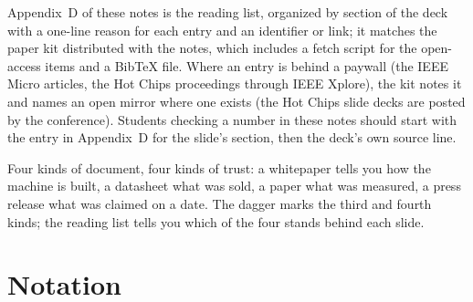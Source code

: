 \documentclass[11pt,letterpaper]{article}
\newcommand{\setstage}[1]{\colorlet{stagec}{#1}}
\newenvironment{intuition}{\begin{tcolorbox}[intuitionbox]}{\end{tcolorbox}}
\begin{document}
Appendix~D of these notes is the reading list, organized by section of the deck with a one-line reason for each entry and an identifier or link; it matches the paper kit distributed with the notes, which includes a fetch script for the open-access items and a BibTeX file. Where an entry is behind a paywall (the IEEE Micro articles, the Hot Chips proceedings through IEEE Xplore), the kit notes it and names an open mirror where one exists (the Hot Chips slide decks are posted by the conference). Students checking a number in these notes should start with the entry in Appendix~D for the slide's section, then the deck's own source line.

\begin{intuition}
Four kinds of document, four kinds of trust: a whitepaper tells you how the machine is built, a datasheet what was sold, a paper what was measured, a press release what was claimed on a date. The dagger marks the third and fourth kinds; the reading list tells you which of the four stands behind each slide.
\end{intuition}
\clearpage
\appendix
\setstage{ink}
\section{Notation}
\end{document}
